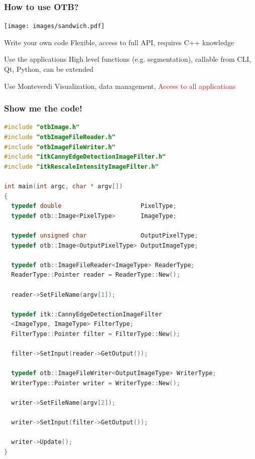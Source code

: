 \documentclass[8pt]{beamer}
\begin{document}
\begin{frame}
\frametitle{How to use OTB?}
\vspace{-0.5cm}
\begin{center}
\texttt{[image: images/sandwich.pdf]}
\end{center}
\vspace{-0.5cm}
\begin{block}{Write your own code}
 Flexible, access to full API, requires C++ knowledge
\end{block}
\begin{block}{Use the applications}
 High level functions (e.g. segmentation), callable from CLI, Qt, Python, can be extended
\end{block}
\begin{block}{Use Monteverdi}
Visualization, data management, \textcolor{red}{Access to all applications}
\end{block}
\end{frame}

\begin{frame}[fragile]
\frametitle{Show me the code!}
\begin{lstlisting}[language=c++,breaklines=true,breakatwhitespace=true,frame = tb,framerule = 0.25pt,fontadjust,backgroundcolor={\color{listlightgray}},basicstyle = {\ttfamily\tiny},keywordstyle = {\ttfamily\color{listkeyword}\textbf},identifierstyle = {\ttfamily},commentstyle = {\ttfamily\color{listcomment}\textit},stringstyle = {\ttfamily},showstringspaces = false,showtabs = false,numbers = none,numbersep = 2pt, numberstyle={\ttfamily\color{listnumbers}},tabsize = 2]
#include "otbImage.h"
#include "otbImageFileReader.h"
#include "otbImageFileWriter.h"
#include "itkCannyEdgeDetectionImageFilter.h"
#include "itkRescaleIntensityImageFilter.h"

int main(int argc, char * argv[])
{
  typedef double                      PixelType;
  typedef otb::Image<PixelType>       ImageType;

  typedef unsigned char               OutputPixelType;
  typedef otb::Image<OutputPixelType> OutputImageType;

  typedef otb::ImageFileReader<ImageType> ReaderType;
  ReaderType::Pointer reader = ReaderType::New();

  reader->SetFileName(argv[1]);

  typedef itk::CannyEdgeDetectionImageFilter
  <ImageType, ImageType> FilterType;
  FilterType::Pointer filter = FilterType::New();

  filter->SetInput(reader->GetOutput());

  typedef otb::ImageFileWriter<OutputImageType> WriterType;
  WriterType::Pointer writer = WriterType::New();

  writer->SetFileName(argv[2]);

  writer->SetInput(filter->GetOutput());

  writer->Update();
}
\end{lstlisting}
\end{frame}
\end{document}
